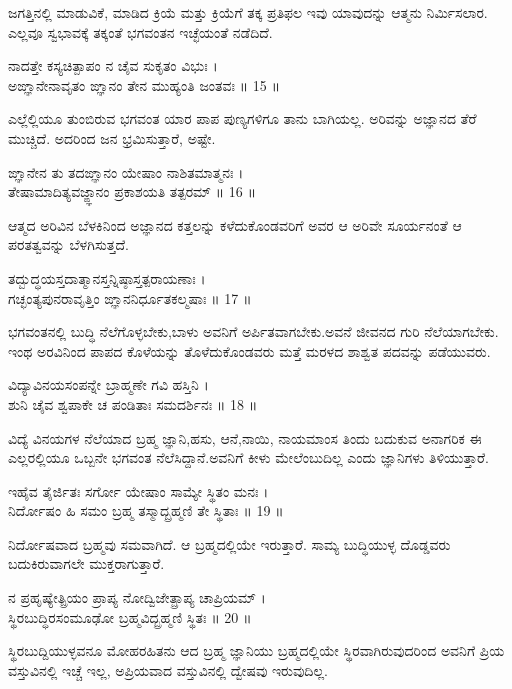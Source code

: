 \begin{quoting}
ಜಗತ್ತಿನಲ್ಲಿ ಮಾಡುವಿಕೆ, ಮಾಡಿದ ಕ್ರಿಯೆ ಮತ್ತು ಕ್ರಿಯೆಗೆ ತಕ್ಕ ಪ್ರತಿಫಲ ಇವು ಯಾವುದನ್ನು ಆತ್ಮನು ನಿರ್ಮಿಸಲಾರ. ಎಲ್ಲವೂ ಸ್ವಭಾವಕ್ಕೆ ತಕ್ಕಂತೆ ಭಗವಂತನ ಇಚ್ಛೆಯಂತೆ ನಡೆದಿದೆ.\\
\end{quoting}
ನಾದತ್ತೇ ಕಸ್ಯಚಿತ್ಪಾಪಂ ನ ಚೈವ ಸುಕೃತಂ ವಿಭುಃ ।\\
ಅಙ್ಞಾನೇನಾವೃತಂ ಙ್ಞಾನಂ ತೇನ ಮುಹ್ಯಂತಿ ಜಂತವಃ ॥ 15 ॥
\begin{quoting}
ಎಲ್ಲೆಲ್ಲಿಯೂ ತುಂಬಿರುವ ಭಗವಂತ ಯಾರ ಪಾಪ ಪುಣ್ಯಗಳಿಗೂ ತಾನು ಬಾಗಿಯಲ್ಲ. ಅರಿವನ್ನು ಅಜ್ಞಾನದ ತೆರೆ ಮುಚ್ಚಿದೆ. ಅದರಿಂದ ಜನ ಭ್ರಮಿಸುತ್ತಾರೆ, ಅಷ್ಟೇ.\\
\end{quoting}
ಙ್ಞಾನೇನ ತು ತದಙ್ಞಾನಂ ಯೇಷಾಂ ನಾಶಿತಮಾತ್ಮನಃ ।\\
ತೇಷಾಮಾದಿತ್ಯವಜ್ಙ್ಞಾನಂ ಪ್ರಕಾಶಯತಿ ತತ್ಪರಮ್ ॥ 16 ॥
\begin{quoting}
ಆತ್ಮದ ಅರಿವಿನ ಬೆಳಕಿನಿಂದ ಅಜ್ಞಾನದ ಕತ್ತಲನ್ನು ಕಳೆದುಕೊಂಡವರಿಗೆ ಅವರ ಆ ಅರಿವೇ ಸೂರ್ಯನಂತೆ ಆ ಪರತತ್ವವನ್ನು ಬೆಳಗಿಸುತ್ತದೆ.\\
\end{quoting}
ತದ್ಬುದ್ಧಯಸ್ತದಾತ್ಮಾನಸ್ತನ್ನಿಷ್ಠಾಸ್ತತ್ಪರಾಯಣಾಃ ।\\
ಗಚ್ಛಂತ್ಯಪುನರಾವೃತ್ತಿಂ ಙ್ಞಾನನಿರ್ಧೂತಕಲ್ಮಷಾಃ ॥ 17 ॥
\begin{quoting}
ಭಗವಂತನಲ್ಲಿ ಬುದ್ಧಿ ನೆಲೆಗೊಳ್ಳಬೇಕು,ಬಾಳು ಅವನಿಗೆ ಅರ್ಪಿತವಾಗಬೇಕು.ಅವನೆ ಜೀವನದ ಗುರಿ ನೆಲೆಯಾಗಬೇಕು. ಇಂಥ ಅರವಿನಿಂದ ಪಾಪದ ಕೊಳೆಯನ್ನು ತೊಳೆದುಕೊಂಡವರು ಮತ್ತೆ ಮರಳದ ಶಾಶ್ವತ ಪದವನ್ನು ಪಡೆಯುವರು.\\
\end{quoting}
ವಿದ್ಯಾವಿನಯಸಂಪನ್ನೇ ಬ್ರಾಹ್ಮಣೇ ಗವಿ ಹಸ್ತಿನಿ ।\\
ಶುನಿ ಚೈವ ಶ್ವಪಾಕೇ ಚ ಪಂಡಿತಾಃ ಸಮದರ್ಶಿನಃ ॥ 18 ॥
\begin{quoting}
ವಿದ್ಯೆ ವಿನಯಗಳ ನೆಲೆಯಾದ ಬ್ರಹ್ಮ ಜ್ಞಾನಿ,ಹಸು, ಆನೆ,ನಾಯಿ, ನಾಯಮಾಂಸ ತಿಂದು ಬದುಕುವ ಅನಾಗರಿಕ ಈ ಎಲ್ಲರಲ್ಲಿಯೂ ಒಬ್ಬನೇ ಭಗವಂತ ನೆಲೆಸಿದ್ದಾನೆ.ಅವನಿಗೆ ಕೀಳು ಮೇಲೆಂಬುದಿಲ್ಲ ಎಂದು ಜ್ಞಾನಿಗಳು ತಿಳಿಯುತ್ತಾರೆ.\\
\end{quoting}
ಇಹೈವ ತೈರ್ಜಿತಃ ಸರ್ಗೋ ಯೇಷಾಂ ಸಾಮ್ಯೇ ಸ್ಥಿತಂ ಮನಃ ।\\
ನಿರ್ದೋಷಂ ಹಿ ಸಮಂ ಬ್ರಹ್ಮ ತಸ್ಮಾದ್ಬ್ರಹ್ಮಣಿ ತೇ ಸ್ಥಿತಾಃ ॥ 19 ॥
\begin{quoting}
ನಿರ್ದೋಷವಾದ ಬ್ರಹ್ಮವು ಸಮವಾಗಿದೆ. ಆ ಬ್ರಹ್ಮದಲ್ಲಿಯೇ ಇರುತ್ತಾರೆ. ಸಾಮ್ಯ ಬುದ್ಧಿಯುಳ್ಳ ದೊಡ್ಡವರು ಬದುಕಿರುವಾಗಲೇ ಮುಕ್ತರಾಗುತ್ತಾರೆ.\\
\end{quoting}
ನ ಪ್ರಹೃಷ್ಯೇತ್ಪ್ರಿಯಂ ಪ್ರಾಪ್ಯ ನೋದ್ವಿಜೇತ್ಪ್ರಾಪ್ಯ ಚಾಪ್ರಿಯಮ್ ।\\
ಸ್ಥಿರಬುದ್ಧಿರಸಂಮೂಢೋ ಬ್ರಹ್ಮವಿದ್ಬ್ರಹ್ಮಣಿ ಸ್ಥಿತಃ ॥ 20 ॥
\begin{quoting}
ಸ್ಥಿರಬುದ್ದಿಯುಳ್ಳವನೂ ಮೋಹರಹಿತನು ಆದ ಬ್ರಹ್ಮ ಜ್ಞಾನಿಯು ಬ್ರಹ್ಮದಲ್ಲಿಯೇ ಸ್ಥಿರವಾಗಿರುವುದರಿಂದ ಅವನಿಗೆ ಪ್ರಿಯ ವಸ್ತುವಿನಲ್ಲಿ ಇಚ್ಚೆ ಇಲ್ಲ, ಅಪ್ರಿಯವಾದ ವಸ್ತುವಿನಲ್ಲಿ ದ್ವೇಷವು ಇರುವುದಿಲ್ಲ.\\
\end{quoting}
